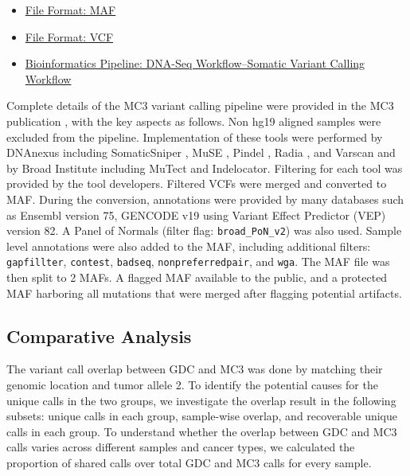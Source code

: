 \tightlists
\begin{itemize}
    \tightlist
    \item \href{https://docs.gdc.cancer.gov/Data/File_Formats/MAF_Format/}{File Format: MAF}
    \item \href{https://docs.gdc.cancer.gov/Data/File_Formats/VCF_Format/}{File Format: VCF}
    \item \href{https://docs.gdc.cancer.gov/Data/Bioinformatics_Pipelines/DNA_Seq_Variant_Calling_Pipeline/#somatic-variant-calling-workflow}{Bioinformatics Pipeline: DNA-Seq Workflow--Somatic Variant Calling Workflow}
\end{itemize}

Complete details of the MC3 variant calling pipeline were provided in the MC3 publication \cite{ellrottk_tcga:MC3MutationCalling2018}, with the key aspects as follows. Non hg19 aligned samples were excluded from the pipeline. Implementation of these tools were performed by DNAnexus including SomaticSniper \cite{larsonde_dingl:SomaticSniper2012}, MuSE \cite{fany_wangw:MuSE2016}, Pindel \cite{yek_ningz:Pindel2009}, Radia \cite{radenbaughaj_hausslerd:RADIA2014}, and Varscan \cite{koboldtdc_wilsonrk:VarScan22012} and by Broad Institute including MuTect \cite{cibulskisk_getzg:SensitiveDetection2013} and Indelocator. Filtering for each tool was provided by the tool developers. Filtered VCFs were merged and converted to MAF. During the conversion, annotations were provided by many databases such as Ensembl version 75, GENCODE v19 using Variant Effect Predictor (VEP) version 82. A Panel of Normals (filter flag: \texttt{broad\_PoN\_v2}) was also used. Sample level annotations were also added to the MAF, including additional filters: \texttt{gapfillter}, \texttt{contest}, \texttt{badseq}, \texttt{nonpreferredpair}, and \texttt{wga}. The MAF file was then split to 2 MAFs. A flagged MAF available to the public, and a protected MAF harboring all mutations that were merged after flagging potential artifacts.

\subsection{Comparative Analysis}
The variant call overlap between GDC and MC3 was done by matching their genomic location and tumor allele 2. To identify the potential causes for the unique calls in the two groups, we investigate the overlap result in the following subsets: unique calls in each group, sample-wise overlap, and recoverable unique calls in each group. To understand whether the overlap between GDC and MC3 calls varies across different samples and cancer types, we calculated the proportion of shared calls over total GDC and MC3 calls for every sample.

